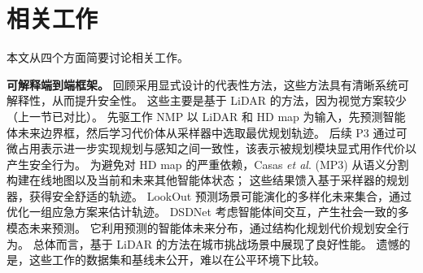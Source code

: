 \documentclass[runningheads]{llncs}
\begin{document}








\section{相关工作}\label{sec: related work}
本文从四个方面简要讨论相关工作。

\noindent\textbf{可解释端到端框架。}
回顾采用显式设计的代表性方法\cite{cui2021lookout,zeng2019end,zeng2020dsdnet,sadat2020perceive,casas2021mp3}，这些方法具有清晰系统可解释性，从而提升安全性。
%
这些主要是基于 LiDAR 的方法，因为视觉方案较少（上一节已对比）。
%
先驱工作 NMP\cite{zeng2019end} 以 LiDAR 和 HD map 为输入，先预测智能体未来边界框，然后学习代价体从采样器中选取最优规划轨迹。
%
后续 P3\cite{sadat2020perceive} 通过可微占用表示进一步实现规划与感知之间一致性，该表示被规划模块显式用作代价以产生安全行为。
%
为避免对 HD map 的严重依赖，Casas \textit{et al}. (MP3)\cite{casas2021mp3} 从语义分割构建在线地图以及当前和未来其他智能体状态；
%
这些结果馈入基于采样器的规划器，获得安全舒适的轨迹。
%
LookOut\cite{cui2021lookout} 预测场景可能演化的多样化未来集合，通过优化一组应急方案来估计轨迹。
%
DSDNet\cite{zeng2020dsdnet} 考虑智能体间交互，产生社会一致的多模态未来预测。
%
它利用预测的智能体未来分布，通过结构化规划代价规划安全行为。
%
总体而言，基于 LiDAR 的方法在城市挑战场景中展现了良好性能。
%
遗憾的是，这些工作的数据集和基线未公开，难以在公平环境下比较。
\end{document}

